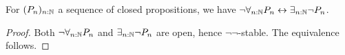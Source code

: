 \begin{lemma}\label{ClosedMarkov}
  For $(P_n)_{n:\mathbb{N}}$ a sequence of closed propositions, we have 
  $\neg \forall_{n:\mathbb{N}} P_n \leftrightarrow  \exists_{n:\mathbb{N}} \neg P_n$. 
\end{lemma}
\begin{proof}
  Both $\neg \forall_{n:\mathbb{N}} P_n$ and $\exists_{n:\mathbb{N}} \neg P_n$ are open, hence $\neg\neg$-stable.
  The equivalence follows. 
\end{proof} 

